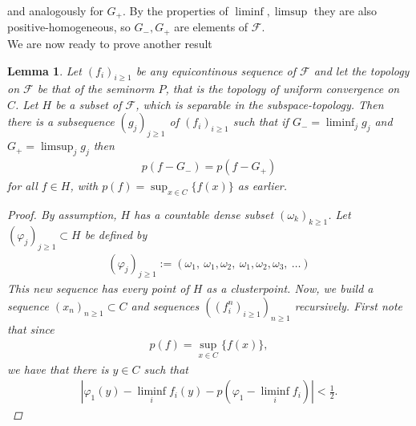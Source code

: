\documentclass[10pt,twoside,openany,final]{memoir}
\theoremstyle{break}
\newtheorem{lemma}[section]{Lemma}
\theoremstyle{Break}
\begin{document}
and analogously for $G_{+}$. By the properties of $\liminf,\limsup$ they are also positive-homogeneous, so $G_{-},G_{+}$ are elements of $\mathcal{F}$. \\
We are now ready to prove another result
\begin{lemma}\label{pryce 2}
Let $(f_{i})_{i\geq 1}$ be any equicontinous sequence of $\mathcal{F}$ and let the topology on $\mathcal{F}$ be that of the seminorm $P$, that is the topology of uniform convergence on $C$. Let $H$ be a subset of $\mathcal{F}$, which is separable in the subspace-topology. Then there is a subsequence $(g_{j})_{j\geq 1}$ of $(f_{i})_{i\geq 1}$ such that if $G_{-}=\liminf_{j}g_{j}$ and $G_{+}=\limsup_{j}g_{j}$  then 
\begin{align*}
p(f-G_{-})=p(f-G_{+})
\end{align*}
for all $f \in H$, with $\displaystyle p(f)=\sup_{x \in C}\{ f(x) \}$ as earlier.
\begin{proof}
By assumption, $H$ has a countable dense subset $(\omega_{k})_{k \geq 1}$. Let $(\varphi_{j})_{j\geq 1}\subset H$ be defined by
\begin{align*}
(\varphi_{j})_{j\geq 1}:=(\omega_{1},\ \omega_{1},\omega_{2},\ \omega_{1},\omega_{2},\omega_{3},\ \dots)
\end{align*} 
This new sequence has every point of $H$ as a clusterpoint. Now, we build a sequence $(x_{n})_{n \geq 1} \subset C$ and sequences $\left((f_{i}^n)_{i\geq 1}\right)_{n\geq 1}$ recursively. First note that since 
\begin{align*}
p(f)=\sup_{x \in C} \{ f(x) \},
\end{align*}
we have that there is $y \in C$ such that
\begin{align*}
|\varphi_{1}(y)-\liminf_{i} f_{i}(y)-p(\varphi_{1}-\liminf_{i} f_{i})| < \frac12.
\end{align*}


\end{proof}
\end{lemma}
\end{document}
